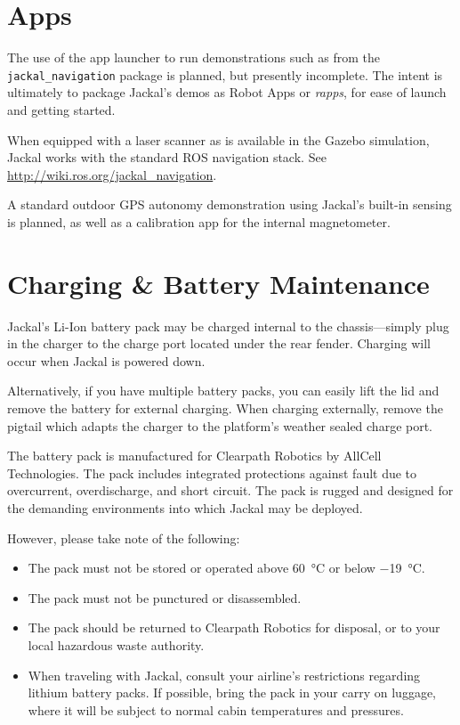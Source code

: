 \documentclass[]{clearpath-manual}
\begin{document}
\section{Apps}

\begin{warning}
The use of the app launcher to run demonstrations such as from the \lstinline{jackal_navigation}
package is planned, but presently incomplete. The intent is ultimately to package Jackal's demos as
Robot Apps or \textit{rapps}, for ease of launch and getting started.
\end{warning}

When equipped with a laser scanner as is available in the Gazebo simulation, Jackal works with the
standard ROS navigation stack. See \url{http://wiki.ros.org/jackal_navigation}.

A standard outdoor GPS autonomy demonstration using Jackal's built-in sensing is planned, as well
as a calibration app for the internal magnetometer.


\section{Charging \& Battery Maintenance}

Jackal's Li-Ion battery pack may be charged internal to the chassis---simply plug in
the charger to the charge port located under the rear fender. Charging will occur
when Jackal is powered down.

Alternatively, if you have multiple battery packs, you can easily lift the lid and
remove the battery for external charging. When charging externally, remove the pigtail
which adapts the charger to the platform's weather sealed charge port.

The battery pack is manufactured for Clearpath Robotics by AllCell Technologies. The
pack includes integrated protections against fault due to overcurrent, overdischarge,
and short circuit. The pack is rugged and designed for the demanding environments into
which Jackal may be deployed.

However, please take note of the following:

\begin{itemize}
\item The pack must not be stored or operated above \SI{60}{\celsius} or below \SI{-19}{\celsius}.
\item The pack must not be punctured or disassembled.
\item The pack should be returned to Clearpath Robotics for disposal, or to your
local hazardous waste authority.
\item When traveling with Jackal, consult your airline's restrictions regarding lithium
battery packs. If possible, bring the pack in your carry on luggage, where it will
be subject to normal cabin temperatures and pressures.
\end{itemize}
\end{document}
